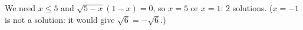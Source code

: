We need $x\le5$ and $\sqrt{5-x}(1-x)=0$, so $x=5$ or $x=1$: $\boxed{2}$ solutions. ($x=-1$ is not a solution: it would give $\sqrt6=-\sqrt6$.)
